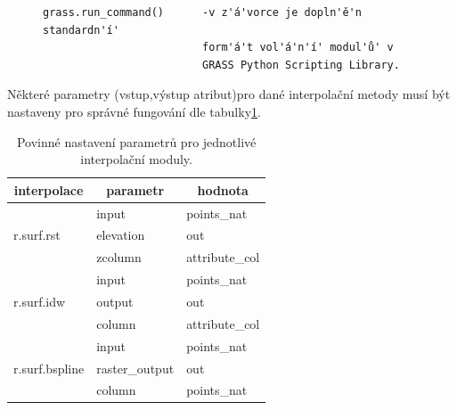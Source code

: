\documentclass[a4paper,12pt]{report}
\begin{document}
\begin{figure}[h!]
\begin{footnotesize}
\lstset{extendedchars=false,
escapeinside=''}
\begin{lstlisting}[style=mybash]
grass.run_command()      -v z'á'vorce je dopln'ě'n standardn'í' 
                         form'á't vol'á'n'í' modul'ů' v 
                         GRASS Python Scripting Library.                                                             
\end{lstlisting}
\end{footnotesize}
\end{figure}


Některé parametry (vstup,výstup atribut)pro dané interpolační metody musí být nastaveny pro správné fungování dle tabulky\ref{tab:interpol}.


\begin{table}[h]
\centering
\begin{tabular}{|lll|}
\hline
\multicolumn{1}{|c}{interpolace} & \multicolumn{1}{c}{parametr} & \multicolumn{1}{c|}{hodnota} \\ \hline\hline
\multirow{3}{*}{r.surf.rst}      & input                        & points\_nat                  \\
                                 & elevation                    & out                          \\
                                 & zcolumn                      & attribute\_col               \\\hline
\multirow{3}{*}{r.surf.idw}      & input                        & points\_nat                  \\
                                 & output                       & out                          \\
                                 & column                       & attribute\_col               \\\hline
\multirow{3}{*}{r.surf.bspline}  & input                        & points\_nat                  \\
                                 & raster\_output               & out                          \\
                                 & column                       & points\_nat                  \\ \hline
\end{tabular}
\caption{Povinné nastavení parametrů pro jednotlivé interpolační moduly.}
\label{tab:interpol}
\end{table}
\end{document}
